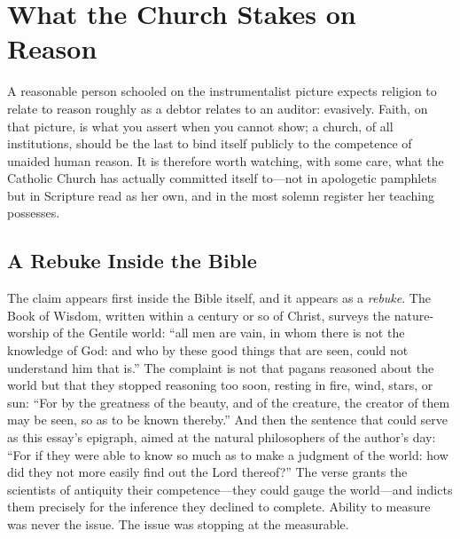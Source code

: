 \section{What the Church Stakes on Reason}

A reasonable person schooled on the instrumentalist picture expects religion to relate to reason roughly as a debtor relates to an auditor: evasively. Faith, on that picture, is what you assert when you cannot show; a church, of all institutions, should be the last to bind itself publicly to the competence of unaided human reason. It is therefore worth watching, with some care, what the Catholic Church has actually committed itself to---not in apologetic pamphlets but in Scripture read as her own, and in the most solemn register her teaching possesses.

\subsection{A Rebuke Inside the Bible}

The claim appears first inside the Bible itself, and it appears as a \emph{rebuke}. The Book of Wisdom, written within a century or so of Christ, surveys the nature-worship of the Gentile world: ``all men are vain, in whom there is not the knowledge of God: and who by these good things that are seen, could not understand him that is.'' The complaint is not that pagans reasoned about the world but that they stopped reasoning too soon, resting in fire, wind, stars, or sun: ``For by the greatness of the beauty, and of the creature, the creator of them may be seen, so as to be known thereby.'' And then the sentence that could serve as this essay's epigraph, aimed at the natural philosophers of the author's day: ``For if they were able to know so much as to make a judgment of the world: how did they not more easily find out the Lord thereof?'' The verse grants the scientists of antiquity their competence---they could gauge the world---and indicts them precisely for the inference they declined to complete. Ability to measure was never the issue. The issue was stopping at the measurable.


